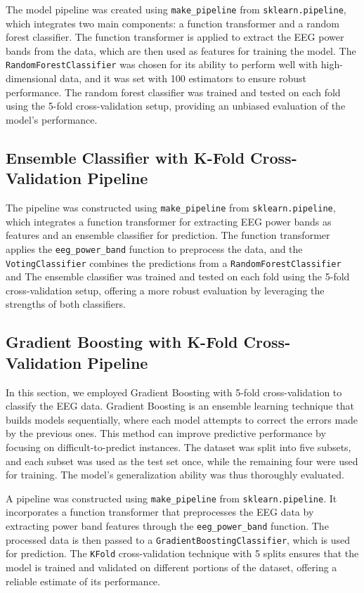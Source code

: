 The model pipeline was created using \texttt{make\_pipeline} from \texttt{sklearn.pipeline}, which integrates two main components: a function transformer and a random forest classifier. The function transformer is applied to extract the EEG power bands from the data, which are then used as features for training the model. The \texttt{RandomForestClassifier} was chosen for its ability to perform well with high-dimensional data, and it was set with 100 estimators to ensure robust performance. The random forest classifier was trained and tested on each fold using the 5-fold cross-validation setup, providing an unbiased evaluation of the model’s performance.



\subsection{Ensemble Classifier with K-Fold Cross-Validation Pipeline}

The pipeline was constructed using \texttt{make\_pipeline} from \texttt{sklearn.pipeline}, which integrates a function transformer for extracting EEG power bands as features and an ensemble classifier for prediction. The function transformer applies the \texttt{eeg\_power\_band} function to preprocess the data, and the \texttt{VotingClassifier} combines the predictions from a \texttt{RandomForestClassifier} and  The ensemble classifier was trained and tested on each fold using the 5-fold cross-validation setup, offering a more robust evaluation by leveraging the strengths of both classifiers.





\subsection{Gradient Boosting with K-Fold Cross-Validation Pipeline}
In this section, we employed Gradient Boosting with 5-fold cross-validation to classify the EEG data. Gradient Boosting is an ensemble learning technique that builds models sequentially, where each model attempts to correct the errors made by the previous ones. This method can improve predictive performance by focusing on difficult-to-predict instances. The dataset was split into five subsets, and each subset was used as the test set once, while the remaining four were used for training. The model's generalization ability was thus thoroughly evaluated.

A pipeline was constructed using \texttt{make\_pipeline} from \texttt{sklearn.pipeline}. It incorporates a function transformer that preprocesses the EEG data by extracting power band features through the \texttt{eeg\_power\_band} function. The processed data is then passed to a \texttt{GradientBoostingClassifier}, which is used for prediction. The \texttt{KFold} cross-validation technique with 5 splits ensures that the model is trained and validated on different portions of the dataset, offering a reliable estimate of its performance.












